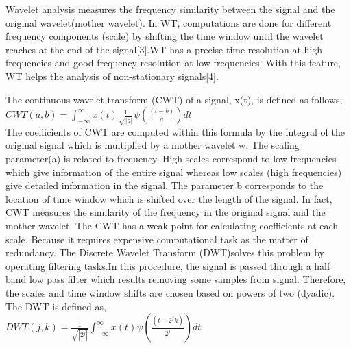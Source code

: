 \documentclass[12pt,letterpaper]{article}
\begin{document}
Wavelet analysis measures the frequency similarity between the signal and the original wavelet(mother wavelet).
In WT, computations are done for different frequency components (scale) by shifting the time window until the wavelet reaches at the end of the signal[3].WT has a precise time resolution at high frequencies and good frequency resolution at low frequencies. With this feature, WT helps the analysis of non-stationary signals[4].


The continuous wavelet transform (CWT) of a signal, x(t), is defined as follows,  \\
$CWT(a,b)=\int_{-\infty}^{\infty} x(t)\frac{1}{\sqrt{|a|}}\psi(\frac{(t-b)}{a})dt$ \\

The coefficients of CWT are computed within this formula by the integral of the original signal which is multiplied by a mother wavelet w. The scaling parameter(a) is related to frequency. High scales correspond to low frequencies which give information of the entire signal whereas low scales (high frequencies) give detailed information in the signal. The parameter b corresponds to the location of time window which is shifted over the length of the signal. In fact, CWT measures the similarity of the frequency in the original signal and the mother wavelet.
The CWT has a weak point for calculating coefficients at each scale. Because it requires expensive computational task as the matter of redundancy.   
The Discrete Wavelet Transform (DWT)solves this problem by operating filtering tasks.In this procedure, the signal is passed through a half band low pass filter which results removing some samples from signal. Therefore, the scales and time window shifts are chosen based on powers of two (dyadic). The DWT is defined as,\\  

$DWT(j,k)=\frac{1}{\sqrt{|2^j|}}\int_{-\infty}^{\infty}x(t)\psi(\frac{(t-2^jk)}{2^j})dt$\\
\end{document}
